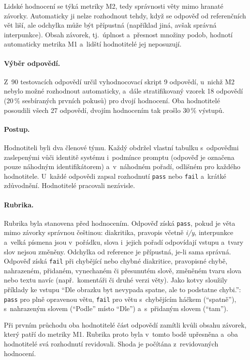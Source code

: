\documentclass[11pt,a4paper]{article}
\begin{document}
Lidské hodnocení se týká metriky M2, tedy správnosti věty mimo
hranaté závorky. Automaticky ji nelze rozhodnout tehdy, když se odpověď
od referenčních vět liší, ale odchylka může být přípustná (například
jiná, avšak správná interpunkce). Obsah závorek, tj.\ úplnost a~přesnost
množiny podob, hodnotí automaticky metrika M1 a~lidští hodnotitelé jej
neposuzují.

\paragraph{Výběr odpovědí.}
Z~90 testovacích odpovědí určil vyhodnocovací skript 9 odpovědí, u~nichž
M2 nebylo možné rozhodnout automaticky, a~dále stratifikovaný vzorek
18 odpovědí (20\,\% sesbíraných prvních pokusů) pro dvojí hodnocení.
Oba hodnotitelé posoudili všech 27 odpovědí, dvojím hodnocením tak
prošlo 30\,\% výstupů.

\paragraph{Postup.}
Hodnotiteli byli dva členové týmu. Každý obdržel vlastní tabulku
s~odpověďmi zaslepenými vůči identitě systému i~podmínce promptu
(odpověď je označena pouze náhodným identifikátorem) a~v~náhodném
pořadí, odlišném pro každého hodnotitele. U~každé odpovědi zapsal
rozhodnutí \texttt{pass} nebo \texttt{fail} a~krátké zdůvodnění.
Hodnotitelé pracovali nezávisle.

\paragraph{Rubrika.}
Rubrika byla stanovena před hodnocením. Odpověď získá \texttt{pass},
pokud je věta mimo závorky správnou češtinou: diakritika, pravopis
včetně \emph{i/y}, interpunkce a~velká písmena jsou v~pořádku, slova
i~jejich pořadí odpovídají vstupu a~tvary slov nejsou změněny. Odchylka
od reference je přípustná, je-li sama správná. Odpověď získá
\texttt{fail} při chybějící nebo chybné diakritice, pravopisné chybě,
nahrazeném, přidaném, vynechaném či přesunutém slově, změněném tvaru
slova nebo textu navíc (např.\ komentáři či druhé verzi věty). Jako
kotvy sloužily příklady ke vstupu \enquote{Dle obrazku byt nevypada
spatne, ale to podstatne chybi.}: \texttt{pass} pro plně opravenou
větu, \texttt{fail} pro větu s~chybějícím háčkem
(\enquote{spatně}), s~nahrazeným slovem (\enquote{Podle} místo
\enquote{Dle}) a~s~přidaným slovem (\enquote{tam}).

Při prvním průchodu oba hodnotitelé část odpovědí zamítli kvůli obsahu
závorek, který patří do metriky M1. Rubrika proto byla v~tomto bodě
upřesněna a~oba hodnotitelé svá rozhodnutí revidovali. Shoda je
počítána z~revidovaných hodnocení.
\end{document}
